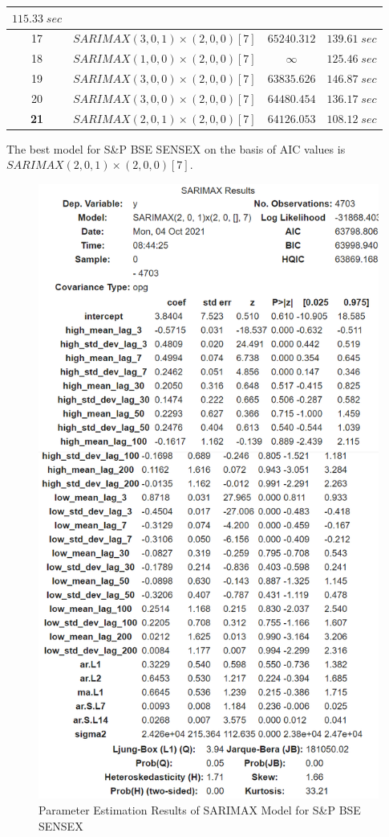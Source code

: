 \documentclass[conference]{IEEEtran}
\begin{document}
\begin{table}[htbp]
\begin{tabular}{|c|c|c|c|}
        $115.33\;sec$ \\
        \hline
        17 & $SARIMAX(3, 0, 1) \times (2, 0, 0)[7]$ & $65240.312$ & $139.61\;sec$ \\
        \hline
        18 & $SARIMAX(1, 0, 0) \times (2, 0, 0)[7]$ & $\infty$ &
        $125.46\;sec$ \\
        \hline
        19 & $SARIMAX(3, 0, 0) \times (2, 0, 0)[7]$ & $63835.626$ & $146.87\;sec$ \\
        \hline
        20 & $SARIMAX(3, 0, 0) \times (2, 0, 0)[7]$ & $64480.454$ & $136.17\;sec$ \\
        \hline
        \textbf{21} & $SARIMAX(2, 0, 1) \times (2, 0, 0)[7]$ & $64126.053$ & $108.12\;sec$ \\
        \hline
    \end{tabular}
    \label{tab:sensex_hyperparameters_tunning_result_table}
\end{table}
The best model for S\&P BSE SENSEX on the basis of AIC values is $SARIMAX(2, 0, 1) \times (2, 0, 0)[7]$.

\begin{figure}[htbp]
    \centering
    \includegraphics[width = 0.75 \textwidth]{images/SENSEX-SARIMAX-Estimating-Parameters-Results.png}
    \caption{Parameter Estimation Results of SARIMAX Model for S\&P BSE SENSEX}
    \label{fig:sensex_sarimax_parameter_estimation_report}
\end{figure}
\end{document}

